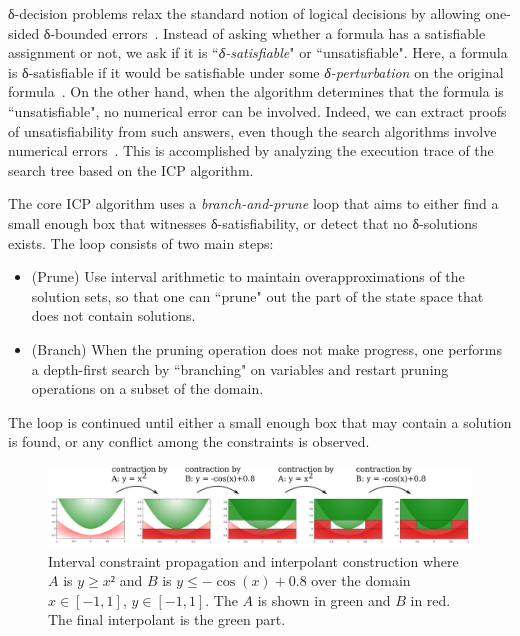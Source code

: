 δ-decision problems relax the standard notion of logical decisions by allowing one-sided δ-bounded errors~\cite{DBLP:conf/lics/GaoAC12,DBLP:conf/cade/GaoAC12}. Instead of asking whether a formula has a satisfiable assignment or not, we ask if it is ``{\em δ-satisfiable}" or ``unsatisfiable". Here, a formula is δ-satisfiable if it would be satisfiable under some {\em δ-perturbation} on the original formula~\cite{DBLP:conf/cade/GaoAC12}. On the other hand, when the algorithm determines that the formula is ``unsatisfiable", no numerical error can be involved. Indeed, we can extract proofs of unsatisfiability from such answers, even though the search algorithms involve numerical errors~\cite{DBLP:conf/synasc/GaoKC14}. This is accomplished by analyzing the execution trace of the search tree based on the ICP algorithm. 


The core ICP algorithm uses a {\em branch-and-prune} loop that aims to either find a small enough box that witnesses δ-satisfiability, or detect that no δ-solutions exists. The loop consists of two main steps:
\begin{itemize}
\item (Prune) Use interval arithmetic to maintain overapproximations of the solution sets, so that one can ``prune" out the part of the state space that does not contain solutions.
\item (Branch) When the pruning operation does not make progress, one performs a depth-first search by ``branching" on variables and restart pruning operations on a subset of the domain. 
\end{itemize}
The loop is continued until either a small enough box that may contain a solution is found, or any conflict among the constraints is observed.

\begin{figure}
\centering
\includegraphics[scale=0.042]{img/example.pdf}
\caption{
    Interval constraint propagation and interpolant construction where $A$ is $y≥x²$ and $B$ is $y ≤ -\cos(x) + 0.8$ over the domain $x∈[-1,1]$, $y∈[-1,1]$.
    The $A$ is shown in green and $B$ in red.
    The final interpolant is the green part.
}
\label{fig:example}
\end{figure}


